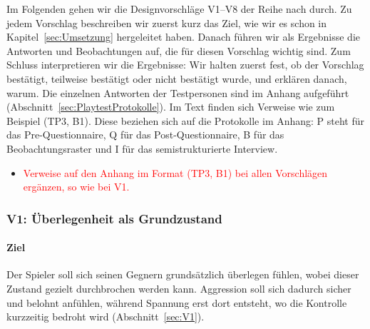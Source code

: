 \documentclass[../Main.tex]{subfiles}
\begin{document}
Im Folgenden gehen wir die Designvorschläge V1--V8 der Reihe nach durch. Zu jedem Vorschlag beschreiben wir zuerst kurz das Ziel, wie wir es schon in Kapitel~\ref{sec:Umsetzung} hergeleitet haben. Danach führen wir als Ergebnisse die Antworten und Beobachtungen auf, die für diesen Vorschlag wichtig sind. Zum Schluss interpretieren wir die Ergebnisse: Wir halten zuerst fest, ob der Vorschlag bestätigt, teilweise bestätigt oder nicht bestätigt wurde, und erklären danach, warum. Die einzelnen Antworten der Testpersonen sind im Anhang aufgeführt (Abschnitt~\ref{sec:PlaytestProtokolle}). Im Text finden sich Verweise wie zum Beispiel (TP3, B1). Diese beziehen sich auf die Protokolle im Anhang: P steht für das Pre-Questionnaire, Q für das Post-Questionnaire, B für das Beobachtungsraster und I für das semistrukturierte Interview.

\begin{itemize}[leftmargin=1.5cm]
    \item \textcolor{red}{Verweise auf den Anhang im Format (TP3, B1) bei allen Vorschlägen ergänzen, so wie bei V1.}
\end{itemize}

\subsubsection{V1: Überlegenheit als Grundzustand}

\paragraph{Ziel}
Der Spieler soll sich seinen Gegnern grundsätzlich überlegen fühlen, wobei dieser Zustand gezielt durchbrochen werden kann. Aggression soll sich dadurch sicher und belohnt anfühlen, während Spannung erst dort entsteht, wo die Kontrolle kurzzeitig bedroht wird (Abschnitt~\ref{sec:V1}).
\end{document}

